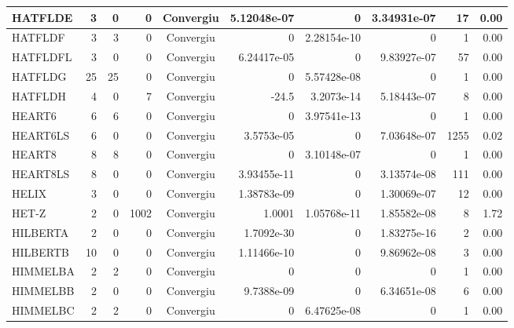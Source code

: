 \begin{center}
\begin{longtable}{|l|r|r|r|c|r|r|r|r|r|}
 HATFLDE &      3 &      0 &      0 & Convergiu  & 5.12048e-07 &              0 & 3.34931e-07 &     17 &    0.00 \\ \hline
 HATFLDF &      3 &      3 &      0 & Convergiu  &           0 &    2.28154e-10 &           0 &      1 &    0.00 \\ \hline
HATFLDFL &      3 &      0 &      0 & Convergiu  & 6.24417e-05 &              0 & 9.83927e-07 &     57 &    0.00 \\ \hline
 HATFLDG &     25 &     25 &      0 & Convergiu  &           0 &    5.57428e-08 &           0 &      1 &    0.00 \\ \hline
 HATFLDH &      4 &      0 &      7 & Convergiu  &       -24.5 &     3.2073e-14 & 5.18443e-07 &      8 &    0.00 \\ \hline
  HEART6 &      6 &      6 &      0 & Convergiu  &           0 &    3.97541e-13 &           0 &      1 &    0.00 \\ \hline
HEART6LS &      6 &      0 &      0 & Convergiu  &  3.5753e-05 &              0 & 7.03648e-07 &   1255 &    0.02 \\ \hline
  HEART8 &      8 &      8 &      0 & Convergiu  &           0 &    3.10148e-07 &           0 &      1 &    0.00 \\ \hline
HEART8LS &      8 &      0 &      0 & Convergiu  & 3.93455e-11 &              0 & 3.13574e-08 &    111 &    0.00 \\ \hline
   HELIX &      3 &      0 &      0 & Convergiu  & 1.38783e-09 &              0 & 1.30069e-07 &     12 &    0.00 \\ \hline
   HET-Z &      2 &      0 &   1002 & Convergiu  &      1.0001 &    1.05768e-11 & 1.85582e-08 &      8 &    1.72 \\ \hline
HILBERTA &      2 &      0 &      0 & Convergiu  &  1.7092e-30 &              0 & 1.83275e-16 &      2 &    0.00 \\ \hline
HILBERTB &     10 &      0 &      0 & Convergiu  & 1.11466e-10 &              0 & 9.86962e-08 &      3 &    0.00 \\ \hline
HIMMELBA &      2 &      2 &      0 & Convergiu  &           0 &              0 &           0 &      1 &    0.00 \\ \hline
HIMMELBB &      2 &      0 &      0 & Convergiu  &  9.7388e-09 &              0 & 6.34651e-08 &      6 &    0.00 \\ \hline
HIMMELBC &      2 &      2 &      0 & Convergiu  &           0 &    6.47625e-08 &           0 &      1 &    0.00 \\ \hline

\end{longtable}
\end{center}
